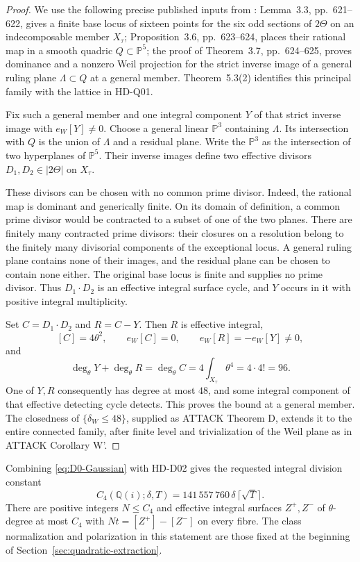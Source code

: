 \begin{proof}
We use the following precise published inputs from \cite{vG96}: Lemma~3.3, pp.~621--622, gives a finite base locus of sixteen points for the six odd sections of $2\Theta$ on an indecomposable member $X_\tau$; Proposition~3.6, pp.~623--624, places their rational map in a smooth quadric $Q\subset\mathbb P^5$; the proof of Theorem~3.7, pp.~624--625, proves dominance and a nonzero Weil projection for the strict inverse image of a general ruling plane $\Lambda\subset Q$ at a general member. Theorem~5.3(2) identifies this principal family with the lattice in HD-Q01.

Fix such a general member and one integral component $Y$ of that strict inverse image with $e_W[Y]\ne0$. Choose a general linear $\mathbb P^3$ containing $\Lambda$. Its intersection with $Q$ is the union of $\Lambda$ and a residual plane. Write the $\mathbb P^3$ as the intersection of two hyperplanes of $\mathbb P^5$. Their inverse images define two effective divisors $D_1,D_2\in|2\Theta|$ on $X_\tau$.

These divisors can be chosen with no common prime divisor. Indeed, the rational map is dominant and generically finite. On its domain of definition, a common prime divisor would be contracted to a subset of one of the two planes. There are finitely many contracted prime divisors: their closures on a resolution belong to the finitely many divisorial components of the exceptional locus. A general ruling plane contains none of their images, and the residual plane can be chosen to contain none either. The original base locus is finite and supplies no prime divisor. Thus $D_1\cdot D_2$ is an effective integral surface cycle, and $Y$ occurs in it with positive integral multiplicity.

Set $C=D_1\cdot D_2$ and $R=C-Y$. Then $R$ is effective integral,
\[
 [C]=4\theta^2,\qquad e_W[C]=0,\qquad
 e_W[R]=-e_W[Y]\ne0,
\]
and
\[
 \deg_\theta Y+\deg_\theta R
 =\deg_\theta C=4\int_{X_\tau}\theta^4=4\cdot4!=96.
\]
One of $Y,R$ consequently has degree at most $48$, and some integral component of that effective detecting cycle detects. This proves the bound at a general member. The closedness of $\{\delta_W\le48\}$, supplied as ATTACK Theorem D, extends it to the entire connected family, after finite level and trivialization of the Weil plane as in ATTACK Corollary W'.
\end{proof}

Combining \eqref{eq:D0-Gaussian} with HD-D02 gives the requested integral division constant
\begin{equation}\label{eq:C4-Gaussian}
 \boxed{C_4(\mathbb Q(i);\delta,T)
 =141\,557\,760\,\delta\,\lceil\sqrt T\rceil.}
\end{equation}
There are positive integers $N\le C_4$ and effective integral surfaces $Z^+,Z^-$ of $\theta$-degree at most $C_4$ with $Nt=[Z^+]-[Z^-]$ on every fibre. The class normalization and polarization in this statement are those fixed at the beginning of Section~\ref{sec:quadratic-extraction}.

